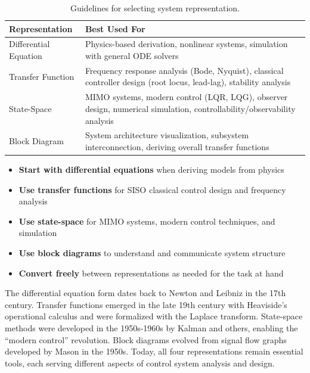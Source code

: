 \begin{table}[htbp]
\centering
\begin{tabular}{lp{10cm}}
\toprule
\textbf{Representation} & \textbf{Best Used For} \\
\midrule
Differential Equation & Physics-based derivation, nonlinear systems, simulation with general ODE solvers \\
Transfer Function & Frequency response analysis (Bode, Nyquist), classical controller design (root locus, lead-lag), stability analysis \\
State-Space & MIMO systems, modern control (LQR, LQG), observer design, numerical simulation, controllability/observability analysis \\
Block Diagram & System architecture visualization, subsystem interconnection, deriving overall transfer functions \\
\bottomrule
\end{tabular}
\caption{Guidelines for selecting system representation.}
\label{tab:representation_guide}
\end{table}

\begin{keyconceptbox}[title=Representation Selection Summary]
\begin{itemize}
    \item \textbf{Start with differential equations} when deriving models from physics
    \item \textbf{Use transfer functions} for SISO classical control design and frequency analysis
    \item \textbf{Use state-space} for MIMO systems, modern control techniques, and simulation
    \item \textbf{Use block diagrams} to understand and communicate system structure
    \item \textbf{Convert freely} between representations as needed for the task at hand
\end{itemize}
\end{keyconceptbox}

\begin{historicalbox}[title=Historical Development of System Representations]
The differential equation form dates back to Newton and Leibniz in the 17th century. Transfer functions emerged in the late 19th century with Heaviside's operational calculus and were formalized with the Laplace transform. State-space methods were developed in the 1950s-1960s by Kalman and others, enabling the ``modern control'' revolution. Block diagrams evolved from signal flow graphs developed by Mason in the 1950s. Today, all four representations remain essential tools, each serving different aspects of control system analysis and design.
\end{historicalbox}

